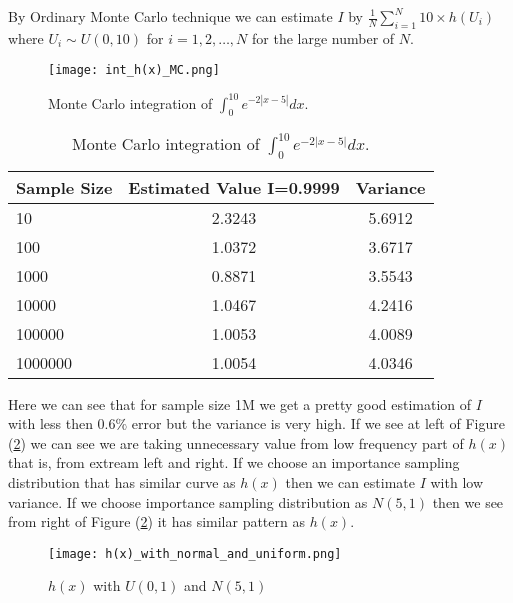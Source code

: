 \begin{example}
	By Ordinary Monte Carlo technique we can estimate $I$ by $\frac{1}{N}\sum_{i = 1}^{N} 10 \times h(U_i)$ where $U_i\sim U(0,10)$ for $i=1,2,\ldots,N$
	for the large number of $N$.
	\begin{figure}[H]
		\centering
		\texttt{[image: int\_h(x)\_MC.png]}
		\caption{Monte Carlo integration of $\int_{0}^{10} e^{-2 |x-5|} dx$.}
		\label{MC:IntegrationOFe-2|x*5|}
	\end{figure}
	\begin{table}[h]
		\centering
		\begin{tabular}{lcc}
			\hline
			Sample Size & Estimated Value I=0.9999 & Variance \\
			\hline
			10          & 2.3243                   & 5.6912   \\
			100         & 1.0372                   & 3.6717   \\
			1000        & 0.8871                   & 3.5543   \\
			10000       & 1.0467                   & 4.2416   \\
			100000      & 1.0053                   & 4.0089   \\
			1000000     & 1.0054                   & 4.0346   \\
			\hline
		\end{tabular}
		\caption{Monte Carlo integration of $\int_{0}^{10} e^{-2 |x-5|} dx$.}
		\label{tab:IntegrationOFe-2|x*5|}
	\end{table}
	Here we can see that for sample size 1M we get a pretty good estimation of $I$ with less then $0.6\%$ error but the variance is very high.
	If we see at left of Figure (\ref{fig:hxwithU01andN01}) we can see we are taking unnecessary value from low frequency part of $h(x)$ that is,
	from extream left and right. If we choose an importance sampling distribution that has similar curve as $h(x)$ then we can estimate $I$ with low variance.
	If we choose importance sampling distribution as $N(5,1)$ then we see from right of Figure (\ref{fig:hxwithU01andN01}) it has similar pattern as $h(x)$.
	\begin{figure}[H]
		\centering
		\texttt{[image: h(x)\_with\_normal\_and\_uniform.png]}
		\caption{$h(x)$ with $U(0,1)$ and $N(5,1)$}
		\label{fig:hxwithU01andN01}
	\end{figure}


\end{example}
